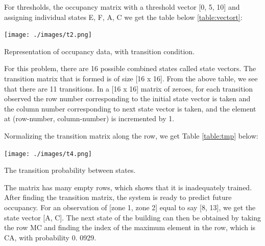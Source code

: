 For thresholds, the occupancy matrix with a threshold vector [0, 5, 10] and assigning individual states {E, F, A, C} we get the table below \ref{table:vectort}:
\begin{table}[!ht]
  \centering
  \texttt{[image: ./images/t2.png]}
  \caption{Representation of occupancy data, with transition condition.}\label{table:vectort}
\end{table}

For this problem, there are 16 possible combined states called state vectors.  The transition matrix that is formed is of size [16 x 16].  From the above table, we see that there are 11 transitions.  In a [16 x 16] matrix of zeroes,  for each transition observed the row number corresponding to the initial state vector is taken and the column number corresponding to next state vector is taken,  and the element at (row-number,  column-number) is incremented by 1.

Normalizing the transition matrix along the row, we get Table \ref{table:tmp} below:
\begin{table}[!ht]
  \centering
    \texttt{[image: ./images/t4.png]}
  \caption{The transition probability between states.}\label{table:tmp}
\end{table}

The matrix has many empty rows, which shows that it is inadequately trained. After finding the transition matrix, the system is ready to predict future occupancy.  For an observation of [zone 1, zone 2] equal to say [8, 13], we get the state vector [A, C].  The next state of the building can then be obtained by taking the row MC and finding the index of the maximum element in the row, which is CA, with probability 0. 0929.


